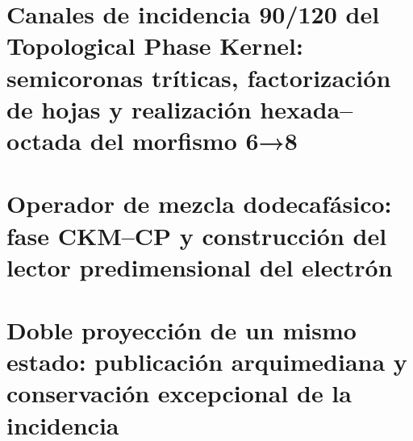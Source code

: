 \chapter{Canales de incidencia 90/120 del Topological Phase Kernel: semicoronas tríticas, factorización de hojas y realización hexada–octada del morfismo 6→8}
\label{chap:sucesor-102-15}
\begin{HMTScientificOwnerSubordinated}

\end{HMTScientificOwnerSubordinated}



















\chapter{Operador de mezcla dodecafásico: fase CKM–CP y construcción del lector predimensional del electrón}
\label{chap:sucesor-102-16}
















\chapter{Doble proyección de un mismo estado: publicación arquimediana y conservación excepcional de la incidencia}
\label{chap:sucesor-102-17}
\label{chap:doble}



